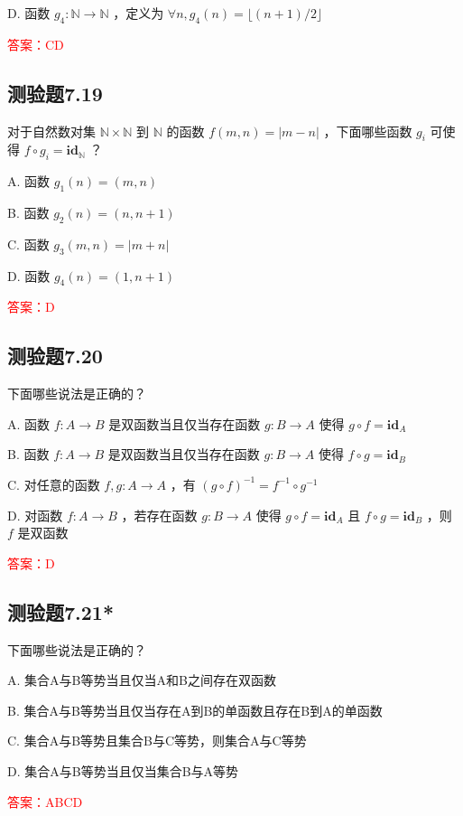 \documentclass[UTF8, heading=true]{ctexart}
\begin{document}
D. 函数 $g_4: \mathbb{N} \rightarrow \mathbb{N}$ ，定义为 $\forall n, g_4(n)=\lfloor(n+1) / 2\rfloor$


\textcolor{red}{答案：CD}

\subsection{测验题7.19}

对于自然数对集 $\mathbb{N} \times \mathbb{N}$ 到 $\mathbb{N}$ 的函数 $f(m, n)=|m-n|$ ，下面哪些函数 $g_i$ 可使得 $f \circ g_i=\mathbf{i d}_{\mathbb{N}}$ ？

A. 函数 $g_1(n)=(m, n)$

B. 函数 $g_2(n)=(n, n+1)$

C. 函数 $g_3(m, n)=|m+n|$

D. 函数 $g_4(n)=(1, n+1)$


\textcolor{red}{答案：D}

\subsection{测验题7.20}

下面哪些说法是正确的？

A. 函数 $f: A \rightarrow B$ 是双函数当且仅当存在函数 $g: B \rightarrow A$ 使得 $g \circ f=\mathbf{i d}_A$

B. 函数 $f: A \rightarrow B$ 是双函数当且仅当存在函数 $g: B \rightarrow A$ 使得 $f \circ g=\mathbf{i d}_B$

C. 对任意的函数 $f, g: A \rightarrow A$ ，有 $(g \circ f)^{-1}=f^{-1} \circ g^{-1}$

D. 对函数 $f: A \rightarrow B$ ，若存在函数 $g: B \rightarrow A$ 使得 $g \circ f=\mathbf{i d}_A$ 且 $f \circ g=\mathbf{i d}_B$ ，则 $f$ 是双函数


\textcolor{red}{答案：D}

\subsection{测验题7.21*}

下面哪些说法是正确的？

A. 集合A与B等势当且仅当A和B之间存在双函数

B. 集合A与B等势当且仅当存在A到B的单函数且存在B到A的单函数

C. 集合A与B等势且集合B与C等势，则集合A与C等势

D. 集合A与B等势当且仅当集合B与A等势

\textcolor{red}{答案：ABCD}
\end{document}
